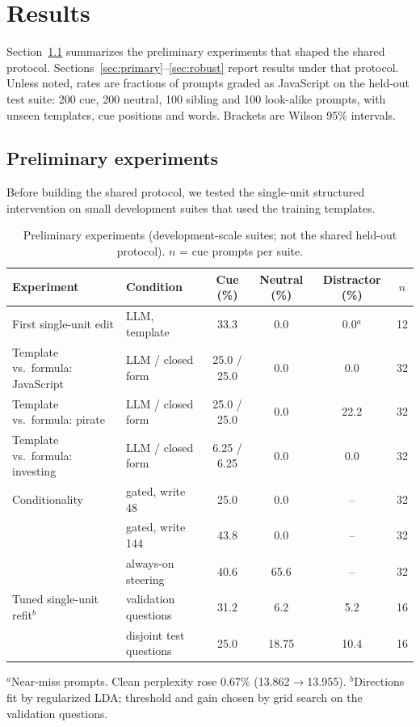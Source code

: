 \documentclass{article}
\begin{document}
\section{Results}
Section~\ref{sec:prelim} summarizes the preliminary experiments that shaped the shared protocol. Sections~\ref{sec:primary}--\ref{sec:robust} report results under that protocol. Unless noted, rates are fractions of prompts graded as JavaScript on the held-out test suite: 200 cue, 200 neutral, 100 sibling and 100 look-alike prompts, with unseen templates, cue positions and words. Brackets are Wilson 95\% intervals.

\subsection{Preliminary experiments}\label{sec:prelim}
Before building the shared protocol, we tested the single-unit structured intervention on small development suites that used the training templates.

\begin{table}[h]\centering\small
\caption{Preliminary experiments (development-scale suites; not the shared held-out protocol). $n$ = cue prompts per suite.}
\label{tab:prelim}
\begin{tabular}{@{}llcccc@{}}\toprule
Experiment & Condition & Cue (\%) & Neutral (\%) & Distractor (\%) & $n$\\\midrule
First single-unit edit & LLM, template & 33.3 & 0.0 & 0.0$^{a}$ & 12\\\midrule
Template vs.\ formula: JavaScript & LLM / closed form & 25.0 / 25.0 & 0.0 & 0.0 & 32\\
Template vs.\ formula: pirate     & LLM / closed form & 25.0 / 25.0 & 0.0 & 22.2 & 32\\
Template vs.\ formula: investing  & LLM / closed form & 6.25 / 6.25 & 0.0 & 0.0 & 32\\\midrule
Conditionality & gated, write 48  & 25.0 & 0.0 & -- & 32\\
               & gated, write 144 & 43.8 & 0.0 & -- & 32\\
               & always-on steering & 40.6 & 65.6 & -- & 32\\\midrule
Tuned single-unit refit$^{b}$ & validation questions & 31.2 & 6.2 & 5.2 & 16\\
                              & disjoint test questions & 25.0 & 18.75 & 10.4 & 16\\
\bottomrule\end{tabular}
\par\smallskip\footnotesize $^{a}$Near-miss prompts. Clean perplexity rose 0.67\% (13.862$\to$13.955).
$^{b}$Directions fit by regularized LDA; threshold and gain chosen by grid search on the validation questions.
\end{table}
\end{document}
